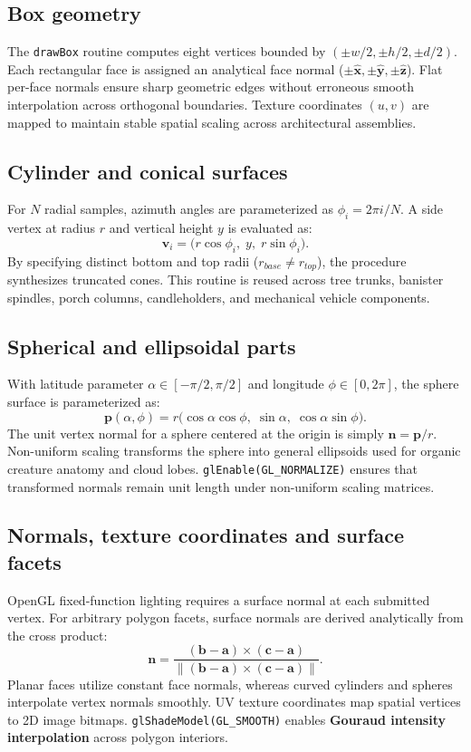 \documentclass[10pt,a4paper,oneside]{article}
\begin{document}
\subsection{Box geometry}
The \texttt{drawBox} routine computes eight vertices bounded by $(\pm w/2,\pm h/2,\pm d/2)$. Each rectangular face is assigned an analytical face normal ($\pm\mathbf{\hat{x}}, \pm\mathbf{\hat{y}}, \pm\mathbf{\hat{z}}$). Flat per-face normals ensure sharp geometric edges without erroneous smooth interpolation across orthogonal boundaries. Texture coordinates $(u, v)$ are mapped to maintain stable spatial scaling across architectural assemblies.

\subsection{Cylinder and conical surfaces}
For $N$ radial samples, azimuth angles are parameterized as $\phi_i = 2\pi i / N$. A side vertex at radius $r$ and vertical height $y$ is evaluated as:
\begin{equation}\mathbf{v}_i = \big(r\cos\phi_i, \; y, \; r\sin\phi_i\big).\end{equation}
By specifying distinct bottom and top radii ($r_{base} \neq r_{top}$), the procedure synthesizes truncated cones. This routine is reused across tree trunks, banister spindles, porch columns, candleholders, and mechanical vehicle components.

\subsection{Spherical and ellipsoidal parts}
With latitude parameter $\alpha \in [-\pi/2, \pi/2]$ and longitude $\phi \in [0, 2\pi]$, the sphere surface is parameterized as:
\begin{equation}\mathbf p(\alpha,\phi) = r\big(\cos\alpha\cos\phi, \; \sin\alpha, \; \cos\alpha\sin\phi\big).\end{equation}
The unit vertex normal for a sphere centered at the origin is simply $\mathbf n = \mathbf p / r$. Non-uniform scaling transforms the sphere into general ellipsoids used for organic creature anatomy and cloud lobes. \texttt{glEnable(GL\_NORMALIZE)} ensures that transformed normals remain unit length under non-uniform scaling matrices.

\subsection{Normals, texture coordinates and surface facets}
OpenGL fixed-function lighting requires a surface normal at each submitted vertex. For arbitrary polygon facets, surface normals are derived analytically from the cross product:
\begin{equation}\mathbf n = \frac{(\mathbf b - \mathbf a) \times (\mathbf c - \mathbf a)}{\|(\mathbf b - \mathbf a) \times (\mathbf c - \mathbf a)\|}.\end{equation}
Planar faces utilize constant face normals, whereas curved cylinders and spheres interpolate vertex normals smoothly. UV texture coordinates map spatial vertices to 2D image bitmaps. \texttt{glShadeModel(GL\_SMOOTH)} enables \textbf{Gouraud intensity interpolation} across polygon interiors.
\end{document}
